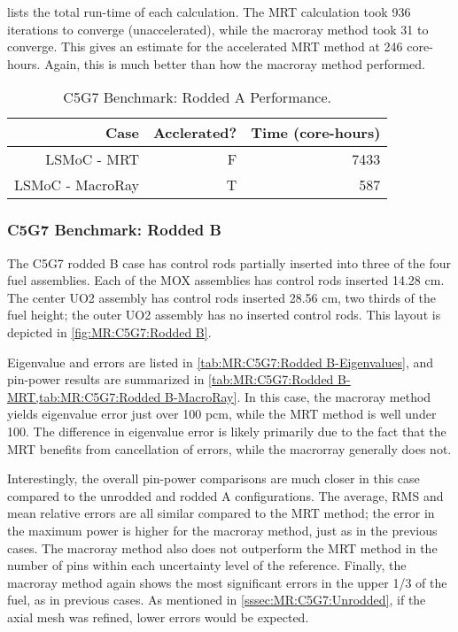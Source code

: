 {{{{         lists the total run-time of each calculation.
        The \ac{MRT} calculation took 936 iterations to converge (unaccelerated), while the macroray method took 31 to converge.
        This gives an estimate for the accelerated \ac{MRT} method at 246 core-hours.
        Again, this is much better than how the macroray method performed.

        \begin{table}[htbp]
          \centering
          \caption{C5G7 Benchmark: Rodded A Performance. \label{tab:MR:C5G7:Rodded A-Performance}}
          \begin{tabular}{rrr}\toprule
            Case                        & Acclerated? & Time (core-hours)\\\midrule
            LSMoC - MRT                 & F &  7433\\
            LSMoC - MacroRay            & T &   587\\\bottomrule
          \end{tabular}
        \end{table}
      }

      \subsubsection{C5G7 Benchmark: Rodded B}{\label{sssec:MR:C5G7:Rodded B}
        The C5G7 rodded B case has control rods partially inserted into three of the four fuel assemblies.
        Each of the \ac{MOX} assemblies has control rods inserted 14.28 cm.
        The center \ac{UO2} assembly has control rods inserted 28.56 cm, two thirds of the fuel height; the outer \ac{UO2} assembly has no inserted control rods.
        This layout is depicted in \cref{fig:MR:C5G7:Rodded B}.

        Eigenvalue and errors are listed in \cref{tab:MR:C5G7:Rodded B-Eigenvalues}, and pin-power results are summarized in \cref{tab:MR:C5G7:Rodded B-MRT,tab:MR:C5G7:Rodded B-MacroRay}.
        In this case, the macroray method yields eigenvalue error just over 100 pcm, while the \ac{MRT} method is well under 100.
        The difference in eigenvalue error is likely primarily due to the fact that the \ac{MRT} benefits from cancellation of errors, while the macrorray generally does not.

        Interestingly, the overall pin-power comparisons are much closer in this case compared to the unrodded and rodded A configurations.
        The average, RMS and mean relative errors are all similar compared to the \ac{MRT} method; the error in the maximum power is higher for the macroray method, just as in the previous cases.
        The macroray method also does not outperform the \ac{MRT} method in the number of pins within each uncertainty level of the reference.
        Finally, the macroray method again shows the most significant errors in the upper 1/3 of the fuel, as in previous cases.
        As mentioned in \cref{sssec:MR:C5G7:Unrodded}, if the axial mesh was refined, lower errors would be expected.

}}}}
